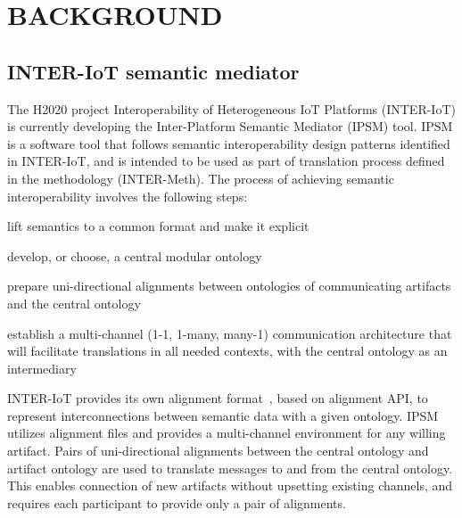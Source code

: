 \documentclass{sig-alternate-05-2015}
\begin{document}

\section{BACKGROUND}

\subsection{INTER-IoT semantic mediator}
The H2020 project Interoperability of Heterogeneous IoT Platforms (INTER-IoT) \cite{Ganzha2016,Ganzha2017a} is currently developing the  Inter-Platform Semantic Mediator (IPSM) tool. IPSM is a software tool that follows semantic interoperability design patterns identified in INTER-IoT, and is intended to be used as part of translation process defined in the methodology (INTER-Meth). The process of achieving semantic interoperability involves the following steps:

\begin{enumerate*}[label=\roman*)]
	\item lift semantics to a common format and make it explicit \cite{Ganzha2017a}
	\item develop, or choose, a central modular ontology
	\item prepare uni-directional alignments between ontologies of communicating artifacts and the central ontology
	\item establish a multi-channel (1-1, 1-many, many-1) communication architecture that will facilitate translations in all needed contexts, with the central ontology as an intermediary
\end{enumerate*}


INTER-IoT provides its own alignment format~\cite{Pawlowski2017}, based on alignment API, to represent interconnections between semantic data with a given ontology. IPSM utilizes alignment files and provides a multi-channel environment for any willing artifact. Pairs of uni-directional alignments between the central ontology and artifact ontology are used to translate messages to and from the central ontology. This enables connection of new artifacts without upsetting existing channels, and requires each participant to provide only a pair of alignments.
\end{document}
